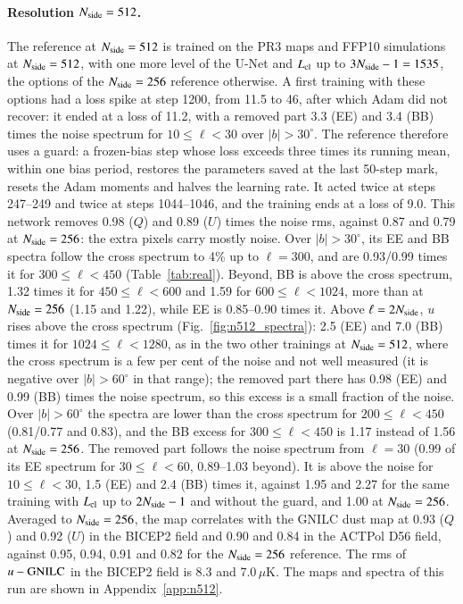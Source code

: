 \documentclass{aa}
\newcommand{\nside}{N_{\rm side}}
\begin{document}
\paragraph{Resolution $\nside=512$.}\label{sec:n512} The reference at $\nside=512$ is trained on the PR3 maps and FFP10 simulations at $\nside=512$, with one more level of the U-Net and $L_{\rm cl}$ up to $3\nside-1=1535$, the options of the $\nside=256$ reference otherwise. A first training with these options had a loss spike at step 1200, from 11.5 to 46, after which Adam did not recover: it ended at a loss of 11.2, with a removed part 3.3 (EE) and 3.4 (BB) times the noise spectrum for $10\le\ell<30$ over $|b|>30^\circ$. The reference therefore uses a guard: a frozen-bias step whose loss exceeds three times its running mean, within one bias period, restores the parameters saved at the last 50-step mark, resets the Adam moments and halves the learning rate. It acted twice at steps 247--249 and twice at steps 1044--1046, and the training ends at a loss of 9.0. This network removes 0.98 ($Q$) and 0.89 ($U$) times the noise rms, against 0.87 and 0.79 at $\nside=256$: the extra pixels carry mostly noise. Over $|b|>30^\circ$, its EE and BB spectra follow the cross spectrum to 4\% up to $\ell=300$, and are 0.93/0.99 times it for $300\le\ell<450$ (Table~\ref{tab:real}). Beyond, BB is above the cross spectrum, 1.32 times it for $450\le\ell<600$ and 1.59 for $600\le\ell<1024$, more than at $\nside=256$ (1.15 and 1.22), while EE is 0.85--0.90 times it. Above $\ell=2\nside$, $u$ rises above the cross spectrum (Fig.~\ref{fig:n512_spectra}): 2.5 (EE) and 7.0 (BB) times it for $1024\le\ell<1280$, as in the two other trainings at $\nside=512$, where the cross spectrum is a few per cent of the noise and not well measured (it is negative over $|b|>60^\circ$ in that range); the removed part there has 0.98 (EE) and 0.99 (BB) times the noise spectrum, so this excess is a small fraction of the noise. Over $|b|>60^\circ$ the spectra are lower than the cross spectrum for $200\le\ell<450$ (0.81/0.77 and 0.83), and the BB excess for $300\le\ell<450$ is 1.17 instead of 1.56 at $\nside=256$. The removed part follows the noise spectrum from $\ell=30$ (0.99 of its EE spectrum for $30\le\ell<60$, 0.89--1.03 beyond). It is above the noise for $10\le\ell<30$, 1.5 (EE) and 2.4 (BB) times it, against 1.95 and 2.27 for the same training with $L_{\rm cl}$ up to $2\nside-1$ and without the guard, and 1.00 at $\nside=256$. Averaged to $\nside=256$, the map correlates with the GNILC dust map at 0.93 ($Q$) and 0.92 ($U$) in the BICEP2 field and 0.90 and 0.84 in the ACTPol D56 field, against 0.95, 0.94, 0.91 and 0.82 for the $\nside=256$ reference. The rms of $u-{\rm GNILC}$ in the BICEP2 field is 8.3 and 7.0\,$\mu$K. The maps and spectra of this run are shown in Appendix~\ref{app:n512}.
\end{document}
